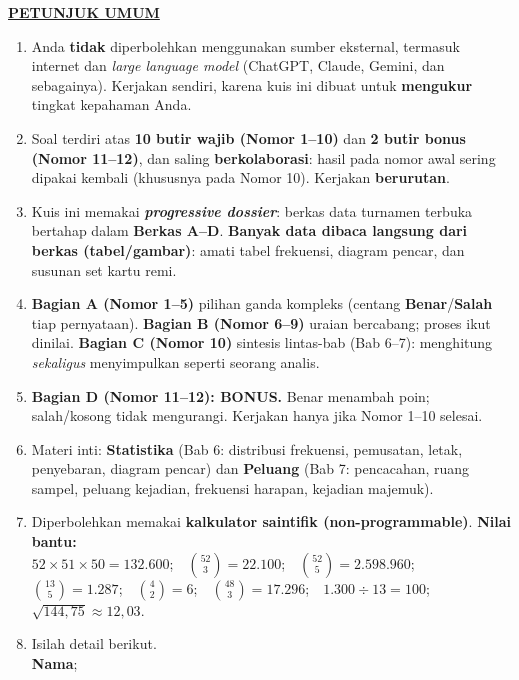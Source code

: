\documentclass[11pt]{article}
\begin{document}
\noindent\textbf{\underline{PETUNJUK UMUM}}
\begin{enumerate}[leftmargin=*,itemsep=2.5pt,topsep=2pt]
  \item Anda \textbf{tidak} diperbolehkan menggunakan sumber eksternal, termasuk
        internet dan \textit{large language model} (ChatGPT, Claude, Gemini, dan
        sebagainya). Kerjakan sendiri, karena kuis ini dibuat untuk
        \textbf{mengukur} tingkat kepahaman Anda.
  \item Soal terdiri atas \textbf{10 butir wajib (Nomor 1--10)} dan \textbf{2 butir
        bonus (Nomor 11--12)}, dan saling \textbf{berkolaborasi}: hasil pada nomor
        awal sering dipakai kembali (khususnya pada Nomor 10). Kerjakan
        \textbf{berurutan}.
  \item Kuis ini memakai \textbf{\textit{progressive dossier}}: berkas data
        turnamen terbuka bertahap dalam \textbf{Berkas A--D}. \textbf{Banyak data
        dibaca langsung dari berkas (tabel/gambar)}: amati tabel frekuensi, diagram
        pencar, dan susunan set kartu remi.
  \item \textbf{Bagian A (Nomor 1--5)} pilihan ganda kompleks (centang
        \textbf{Benar}/\textbf{Salah} tiap pernyataan). \textbf{Bagian B (Nomor
        6--9)} uraian bercabang; proses ikut dinilai. \textbf{Bagian C (Nomor 10)}
        sintesis lintas-bab (Bab 6--7): menghitung \emph{sekaligus} menyimpulkan
        seperti seorang analis.
  \item \textbf{Bagian D (Nomor 11--12): BONUS.} Benar menambah poin; salah/kosong
        tidak mengurangi. Kerjakan hanya jika Nomor 1--10 selesai.
  \item Materi inti: \textbf{Statistika} (Bab 6: distribusi frekuensi, pemusatan,
        letak, penyebaran, diagram pencar) dan \textbf{Peluang} (Bab 7: pencacahan,
        ruang sampel, peluang kejadian, frekuensi harapan, kejadian majemuk).
  \item Diperbolehkan memakai \textbf{kalkulator saintifik (non-programmable)}.
        \textbf{Nilai bantu:}\\[0.2em]
        \small
        $52\times51\times50=132.600$;\ \ $\binom{52}{3}=22.100$;\ \
        $\binom{52}{5}=2.598.960$;\ \ $\binom{13}{5}=1.287$;\ \
        $\binom{4}{2}=6$;\ \ $\binom{48}{3}=17.296$;\ \
        $1.300\div13=100$;\ \ $\sqrt{144{,}75}\approx12{,}03$.
  \item Isilah detail berikut.\\[0.3em]
        \textbf{Nama}\hspace{0.45cm};\enspace\underline{\hspace{8cm}}
\end{enumerate}
\end{document}
